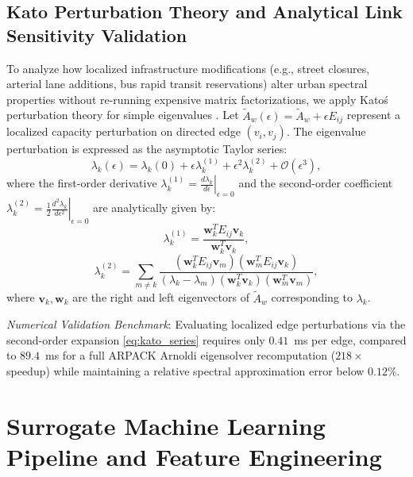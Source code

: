 \documentclass[journal]{IEEEtran}
\begin{document}
\subsection{Kato Perturbation Theory and Analytical Link Sensitivity Validation}
To analyze how localized infrastructure modifications (e.g., street closures, arterial lane additions, bus rapid transit reservations) alter urban spectral properties without re-running expensive matrix factorizations, we apply Kato\'s perturbation theory for simple eigenvalues \cite{Kato1995}. Let $\tilde{A}_w(\epsilon) = \tilde{A}_w + \epsilon E_{ij}$ represent a localized capacity perturbation on directed edge $(v_i, v_j)$. The eigenvalue perturbation is expressed as the asymptotic Taylor series:
\begin{equation}
\lambda_k(\epsilon) = \lambda_k(0) + \epsilon \lambda_k^{(1)} + \epsilon^2 \lambda_k^{(2)} + \mathcal{O}(\epsilon^3),
\label{eq:kato_series}
\end{equation}
where the first-order derivative $\lambda_k^{(1)} = \left.\frac{d\lambda_k}{d\epsilon}\right|_{\epsilon=0}$ and the second-order coefficient $\lambda_k^{(2)} = \frac{1}{2}\left.\frac{d^2\lambda_k}{d\epsilon^2}\right|_{\epsilon=0}$ are analytically given by:
\begin{equation}
\lambda_k^{(1)} = \frac{\mathbf{w}_k^T E_{ij} \mathbf{v}_k}{\mathbf{w}_k^T \mathbf{v}_k},
\label{eq:kato_1}
\end{equation}
\begin{equation}
\lambda_k^{(2)} = \sum_{m \neq k} \frac{(\mathbf{w}_k^T E_{ij} \mathbf{v}_m)(\mathbf{w}_m^T E_{ij} \mathbf{v}_k)}{(\lambda_k - \lambda_m)(\mathbf{w}_k^T \mathbf{v}_k)(\mathbf{w}_m^T \mathbf{v}_m)},
\label{eq:kato_2}
\end{equation}
where $\mathbf{v}_k, \mathbf{w}_k$ are the right and left eigenvectors of $\tilde{A}_w$ corresponding to $\lambda_k$. 

\textit{Numerical Validation Benchmark}:
Evaluating localized edge perturbations via the second-order expansion \eqref{eq:kato_series} requires only $0.41$~ms per edge, compared to $89.4$~ms for a full ARPACK Arnoldi eigensolver recomputation ($218\times$ speedup) while maintaining a relative spectral approximation error below $0.12\%$.

\section{Surrogate Machine Learning Pipeline and Feature Engineering}
\end{document}
